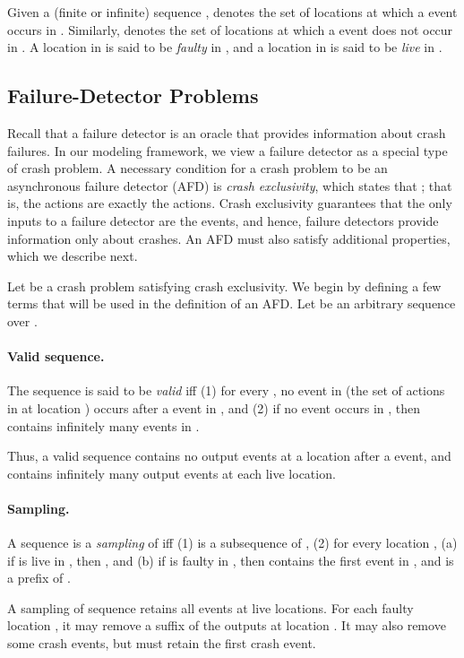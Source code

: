 \documentclass[11pt]{article}
\numberwithin{theorem}{section}
\begin{document}
Given a (finite or infinite) sequence ,  denotes
the set of locations at which a  event occurs in . 
Similarly,  denotes the set of
locations at which a  event does not occur in . 
A location in  is said to be \emph{faulty} in , and
a location in  is said to be \emph{live} in . 



\subsection{Failure-Detector Problems}
\label{subsec:FDproblems}

Recall that a failure detector is an oracle that provides information
about crash failures. 
In our modeling framework, we view a failure detector as a special
type of crash problem.
A necessary condition for a crash problem  to
be an asynchronous failure detector (AFD) is \emph{crash exclusivity},
which states that ; that is, the actions  are
exactly the  actions. 
Crash exclusivity guarantees that the only inputs to a failure
detector are the  events, and hence, failure detectors
provide information only about crashes. 
An AFD must also satisfy additional properties, which we describe next.

Let  be a crash problem satisfying
crash exclusivity. 
We begin by defining a few terms that will be used in the definition of
an AFD. Let  be an arbitrary sequence over .

\paragraph{Valid sequence.} 
The sequence  is said to be \emph{valid} iff 
(1) for every , no event in  (the set of
actions in  at location ) occurs after a  event
in , and 
(2) if no  event occurs in , then  contains infinitely
many events in .

Thus, a valid sequence contains no output events at a location 
after a  event, and contains infinitely many output events at
each live location.

\paragraph{Sampling.} 
A sequence  is a \emph{sampling} of  iff (1)  is a
subsequence of , (2) for every location , (a) if  is
live in , then , and (b) if
 is faulty in , then   contains the first  event in
, and  is a prefix of .

A sampling of sequence  retains all events at live locations.
For each faulty location , it may remove a suffix of the outputs at
location .  It may also remove some crash events, but must retain
the first crash event.
\end{document}
